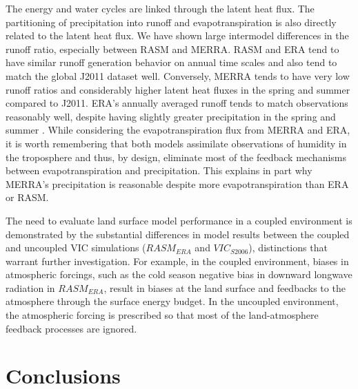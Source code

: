 The energy and water cycles are linked through the latent heat flux.
The partitioning of precipitation into runoff and evapotranspiration is also directly related to the latent heat flux.
We have shown large intermodel differences in the runoff ratio, especially between RASM and MERRA.
RASM and ERA tend to have similar runoff generation behavior on annual time scales and also tend to match the global J2011 dataset well.
Conversely, MERRA tends to have very low runoff ratios and considerably higher latent heat fluxes in the spring and summer compared to J2011.
ERA's annually averaged runoff tends to match observations reasonably well, despite having slightly greater precipitation in the spring and summer \citep[see Fig. \ref{fig:streamflow_scatter} herein; ][]{Lindsay_2014}.
While considering the evapotranspiration flux from MERRA and ERA, it is worth remembering that both models assimilate observations of humidity in the troposphere and thus, by design, eliminate most of the feedback mechanisms between evapotranspiration and precipitation.
This explains in part why MERRA's precipitation is reasonable despite more evapotranspiration than ERA or RASM.

The need to evaluate land surface model performance in a coupled environment is demonstrated by the substantial differences in model results between the coupled and uncoupled VIC simulations ($RASM_{ERA}$ and $VIC_{S2006}$), distinctions that warrant further investigation.
For example, in the coupled environment, biases in atmospheric forcings, such as the cold season negative bias in downward longwave radiation in $RASM_{ERA}$, result in biases at the land surface and feedbacks to the atmosphere through the surface energy budget.
In the uncoupled environment, the atmospheric forcing is prescribed so that most of the land-atmosphere feedback processes are ignored.

\section{Conclusions}
\label{sec:conclusions_ch3}

